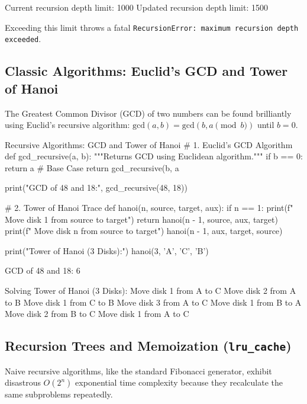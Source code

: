 \begin{outputbox}
Current recursion depth limit: 1000
Updated recursion depth limit: 1500
\end{outputbox}
Exceeding this limit throws a fatal \texttt{RecursionError: maximum recursion depth exceeded}.

\subsection{Classic Algorithms: Euclid's GCD and Tower of Hanoi}
The Greatest Common Divisor (GCD) of two numbers can be found brilliantly using Euclid's recursive algorithm: $\text{gcd}(a, b) = \text{gcd}(b, a \pmod b)$ until $b=0$.

\begin{pythoncode}{Recursive Algorithms: GCD and Tower of Hanoi}
# 1. Euclid's GCD Algorithm
def gcd_recursive(a, b):
    """Returns GCD using Euclidean algorithm."""
    if b == 0:
        return a  # Base Case
    return gcd_recursive(b, a %

print("GCD of 48 and 18:", gcd_recursive(48, 18))

# 2. Tower of Hanoi Trace
def hanoi(n, source, target, aux):
    if n == 1:
        print(f" Move disk 1 from {source} to {target}")
        return
    hanoi(n - 1, source, aux, target)
    print(f" Move disk {n} from {source} to {target}")
    hanoi(n - 1, aux, target, source)

print("\nSolving Tower of Hanoi (3 Disks):")
hanoi(3, 'A', 'C', 'B')
\end{pythoncode}

\begin{outputbox}
GCD of 48 and 18: 6

Solving Tower of Hanoi (3 Disks):
 Move disk 1 from A to C
 Move disk 2 from A to B
 Move disk 1 from C to B
 Move disk 3 from A to C
 Move disk 1 from B to A
 Move disk 2 from B to C
 Move disk 1 from A to C
\end{outputbox}

\subsection{Recursion Trees and Memoization (\texttt{lru\_cache})}
Naive recursive algorithms, like the standard Fibonacci generator, exhibit disastrous $O(2^n)$ exponential time complexity because they recalculate the same subproblems repeatedly.

